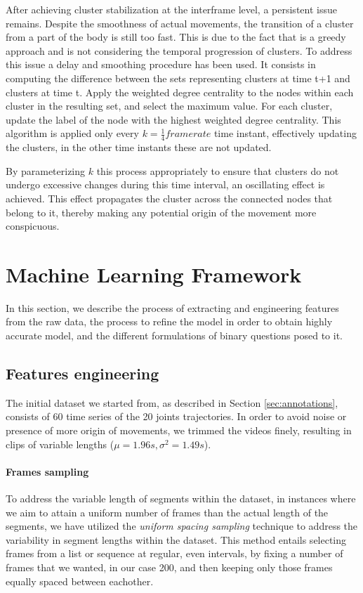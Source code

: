 After achieving cluster stabilization at the interframe level, a persistent issue remains. 
Despite the smoothness of actual movements, the transition of a cluster from a part of the body is still too fast.
This is due to the fact that is a greedy approach and is not considering the temporal progression of clusters.
To address this issue a delay and smoothing procedure has been used.
It consists in computing the difference between the sets representing clusters at time t+1 and clusters at time t.
Apply the weighted degree centrality to the nodes within each cluster in the resulting set, and select the maximum value.
For each cluster, update the label of the node with the highest weighted degree centrality.
This algorithm is applied only every $k = \frac{1}{4}framerate$ time instant, effectively updating the clusters, in the other time instants these are not updated.

By parameterizing $k$ this process appropriately to ensure that clusters do not undergo excessive changes during this time interval, an oscillating effect is achieved. 
This effect propagates the cluster across the connected nodes that belong to it, thereby making any potential origin of the movement more conspicuous.

\clearpage
\section{Machine Learning Framework}
\label{sec:ml_method}
In this section, we describe the process of extracting and engineering features from the raw data, the process to refine the model in order to obtain highly accurate model, and the different formulations of binary questions posed to it.

\subsection{Features engineering}
The initial dataset we started from, as described in Section \ref{sec:annotations}, consists of 60 time series of the 20 joints trajectories.
In order to avoid noise or presence of more origin of movements, we trimmed the videos finely, resulting in clips of variable lengths ($\mu = 1.96s , \sigma^{2} = 1.49s$).

\paragraph{Frames sampling} To address the variable length of segments within the dataset, in instances where we aim to attain a uniform number of frames than the actual length of the segments, 
we have utilized the \textit{uniform spacing sampling} technique to address the variability in segment lengths within the dataset.
This method entails selecting frames from a list or sequence at regular, even intervals, by fixing a number of frames that we wanted, in our case 200, and then keeping only those frames equally spaced between eachother.


